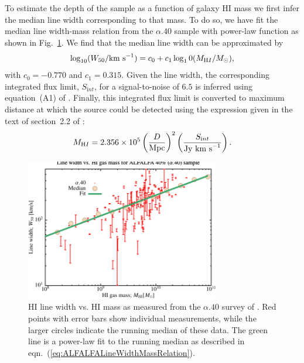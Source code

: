 To estimate the depth of the \cite{martin_arecibo_2010} sample as a function of galaxy HI mass we first infer the median line width corresponding to that mass. To do so, we have fit the median line width-mass relation from the $\alpha.40$ sample with power-law function as shown in Fig.~\ref{fig:ALFALFALineWidthMassRelation}. We find that the median line width can be approximated by
\begin{equation}
 \log_{10} (W_{\mathrm 50}/\hbox{km s}^{-1}) = c_0 + c_1 \log_10(M_{\mathrm HI}/M_\odot),
 \label{eq:ALFALFALineWidthMassRelation}
\end{equation}
with $c_0=-0.770$ and $c_1=0.315$. Given the line width, the corresponding integrated flux limit, $S_{\mathrm int}$, for a signal-to-noise of $6.5$ is inferred using equation~(A1) of \cite{haynes_arecibo_2011}. Finally, this integrated flux limit is converted to maximum distance at which the source could be detected using the expression given in the text of section~2.2 of \cite{martin_arecibo_2010}:
\begin{equation}
 M_{\mathrm HI} = 2.356\times10^5 \left({D\over \hbox{Mpc}}\right)^2 \left({S_{\mathrm int}\over\hbox{Jy km s}^{-1}}\right).
\end{equation}

\begin{figure}
 \begin{center}
  \includegraphics[width=85mm,trim=0mm 0mm 0mm 4mm,clip]{Plots/DataAnalysis/alfalfaHILineWidthMassRelation.pdf}
 \end{center}
 \caption{HI line width vs. HI mass as measured from the $\alpha.40$ survey of \protect\cite{martin_arecibo_2010}. Red points with error bars show individual measurements, while the larger circles indicate the running median of these data. The green line is a power-law fit to the running median as described in eqn.~(\protect\ref{eq:ALFALFALineWidthMassRelation}).}
 \label{fig:ALFALFALineWidthMassRelation}
\end{figure}

